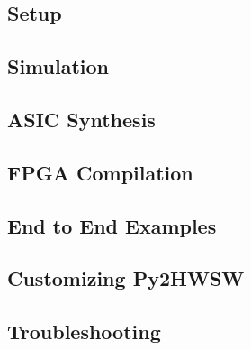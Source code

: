 \documentclass{ug}
\begin{document}
\subsection{Setup}
\label{sec:setup}


\subsection{Simulation}
\label{sec:sim}


\ifdefined\ASICSYNTH
\subsection{ASIC Synthesis}
\label{sec:synth}

\fi

\ifdefined\FPGACOMP
\subsection{FPGA Compilation}
\label{sec:fpga}

\fi

\ifdefined\SECTIONCLEARPAGE
\clearpage
\fi
\subsection{End to End Examples}
\label{sec:examples}


\subsection{Customizing Py2HWSW}
\label{sec:customizing_py2}


\subsection{Troubleshooting}
\label{sec:troubleshooting}


%
%
% 

% 

% 
\end{document}
